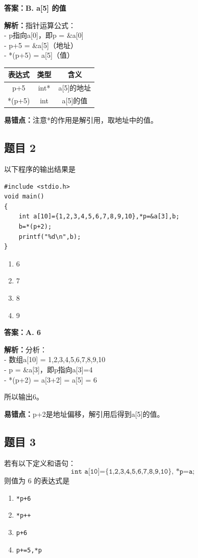 \documentclass[12pt,a4paper]{ctexart}
\begin{document}
\begin{answerbox}
	\textbf{答案：B. a[5] 的值}

	\textbf{解析：}指针运算公式：\\
	- p指向a[0]，即p = \&a[0]\\
	- p+5 = \&a[5]（地址）\\
	- *(p+5) = a[5]（值）

	\begin{tabular}{|c|c|c|}
		\hline
		表达式    & 类型   & 含义      \\
		\hline
		p+5    & int* & a[5]的地址 \\
		\hline
		*(p+5) & int  & a[5]的值  \\
		\hline
	\end{tabular}

	\textbf{易错点：}注意*的作用是解引用，取地址中的值。
\end{answerbox}

\subsection*{题目 2}
以下程序的输出结果是
\begin{lstlisting}
#include <stdio.h>
void main()
{
    int a[10]={1,2,3,4,5,6,7,8,9,10},*p=&a[3],b;
    b=*(p+2);
    printf("%d\n",b);
}
\end{lstlisting}

\begin{enumerate}[label=\Alph*.]
	\item 6
	\item 7
	\item 8
	\item 9
\end{enumerate}

\begin{answerbox}
	\textbf{答案：A. 6}

	\textbf{解析：}分析：\\
	- 数组a[10] = {1,2,3,4,5,6,7,8,9,10}\\
	- p = \&a[3]，即p指向a[3]=4\\
	- *(p+2) = a[3+2] = a[5] = 6

	所以输出6。

	\textbf{易错点：}p+2是地址偏移，解引用后得到a[5]的值。
\end{answerbox}
\subsection*{题目 3}
若有以下定义和语句：
\[
	\texttt{int a[10]=\{1,2,3,4,5,6,7,8,9,10\}, *p=a;}
\]
则值为 6 的表达式是
\begin{enumerate}[label=\Alph*.]
	\item \texttt{*p+6}
	\item \texttt{*p++}
	\item \texttt{p+6}
	\item \texttt{p+=5,*p}
\end{enumerate}
\end{document}
